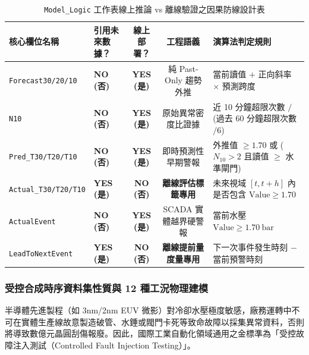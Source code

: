 \documentclass[fontset=none, a4paper, 12pt]{ctexart}
\begin{document}
\begin{doublespace}
\begin{table}[H]
\centering
\caption{\texttt{Model\_Logic} 工作表線上推論 vs 離線驗證之因果防線設計表}
\label{tab:excel_model_logic}
\footnotesize
\renewcommand{\arraystretch}{1.2}
\setlength{\tabcolsep}{5pt}
\begin{tabularx}{0.96\textwidth}{llccX}
\toprule
\textbf{核心欄位名稱} & \textbf{引用未來數據？} & \textbf{線上部署？} & \textbf{工程語義} & \textbf{演算法判定規則} \\
\midrule
\texttt{Forecast30/20/10} & \textbf{NO (否)} & \textbf{YES (是)} & 純 Past-Only 趨勢外推 & 當前讀值 $+$ 正向斜率 $\times$ 預測跨度 \\
\texttt{N10} & \textbf{NO (否)} & \textbf{YES (是)} & 原始異常密度比證據 & 近 10 分鐘超限次數 $/$ (過去 60 分鐘超限次數 $/ 6$) \\
\texttt{Pred\_T30/T20/T10} & \textbf{NO (否)} & \textbf{YES (是)} & 即時預測性早期警報 & 外推值 $\ge 1.70$ 或 ($N_{10} > 2$ 且讀值 $\ge$ 水準閘門) \\
\texttt{Actual\_T30/T20/T10} & \textbf{YES (是)} & \textbf{NO (否)} & \textbf{離線評估標籤專用} & 未來視域 $[t, t+h]$ 內是否包含 $\mathrm{Value} \ge 1.70$ \\
\texttt{ActualEvent} & \textbf{NO (否)} & \textbf{YES (是)} & SCADA 實體越界硬警報 & 當前水壓 $\mathrm{Value} \ge 1.70\ \mathrm{bar}$ \\
\texttt{LeadToNextEvent} & \textbf{YES (是)} & \textbf{NO (否)} & \textbf{離線提前量度量專用} & 下一次事件發生時刻 $-$ 當前預警時刻 \\
\bottomrule
\end{tabularx}
\end{table}

\subsubsection{受控合成時序資料集性質與 12 種工況物理建模}
半導體先進製程（如 3nm/2nm EUV 微影）對冷卻水壓極度敏感，廠務運轉中不可在實體生產線故意製造破管、水錘或閥門卡死等致命故障以採集異常資料，否則將導致數億元晶圓刮傷報廢。因此，國際工業自動化領域通用之金標準為「受控故障注入測試（Controlled Fault Injection Testing）」。


\end{doublespace}
\end{document}
